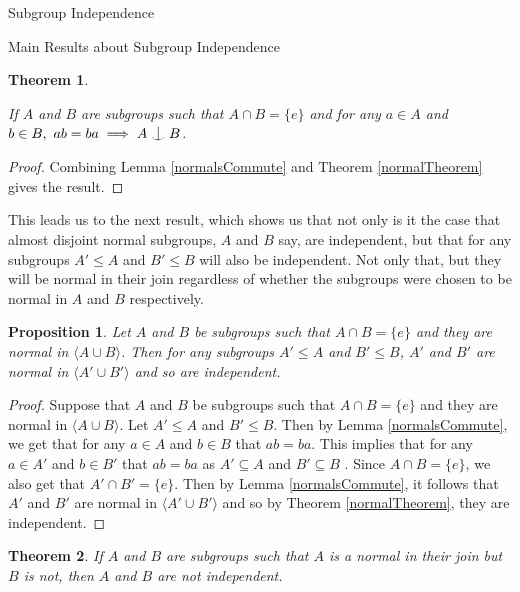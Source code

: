 \documentclass{article}
\newtheorem{proposition}{Proposition}[section]
\newtheorem{theorem}{Theorem}[section]
\def\indep{\mathrel{\raise0.2ex\hbox{\ooalign{\hidewidth$\vert$\hidewidth\cr\raise-0.9ex\hbox{$\smile$}}}}}
\begin{document}
\begin{section}{Subgroup Independence}
\begin{subsection}{Main Results about Subgroup Independence}
			
			\begin{theorem}\label{normalsC}
				
				If $A$ and $B$ are subgroups such that $A \cap B = \{e\}$ and for any $a \in A$ and $b \in B, \ ab =ba \implies A \indep B$. 
			\end{theorem}
			
			\begin{proof}
				
				Combining Lemma \ref{normalsCommute} and Theorem \ref{normalTheorem} gives the result.
			\end{proof}
			
			
			
			This leads us to the next result, which shows us that not only is it the case that almost disjoint normal subgroups, $A$ and $B$ say, are independent, but that for any subgroups $A' \leq A$ and $B' \leq B$  will also be independent. Not only that, but they will be normal in their join regardless of whether the subgroups were chosen to be normal in $A$ and $B$ respectively.
			
			\begin{proposition}
				Let $A$ and $B$ be subgroups such that $A \cap B = \{e\}$ and they are normal in $\langle A \cup B\rangle $. Then for any subgroups $A' \leq A$ and $B' \leq B$, $A'$ and $B'$ are normal in $\langle A' \cup B'\rangle $ and so are independent. 
			\end{proposition}
			
			\begin{proof}
				Suppose that $A$ and $B$ be subgroups such that $A \cap B = \{e\}$ and they are normal in $\langle A \cup B\rangle $. Let $A' \leq A$ and $B' \leq B$. Then by Lemma \ref{normalsCommute}, we get that for any $ a\in A$ and $b \in B$ that $ab=ba$. This implies that for any $a \in A'$ and $b \in B'$ that $ab = ba$ as $A' \subseteq A$ and $B' \subseteq B$ . Since $A \cap B = \{e\}$, we also get that $A' \cap B' = \{e\}.$ Then by Lemma \ref{normalsCommute}, it follows that $A'$ and $B'$ are normal in $\langle A' \cup B'\rangle $ and so by Theorem \ref{normalTheorem}, they are independent.
			\end{proof}
			
			
			
			
			\begin{theorem} \label{ppp}
				If $A$ and $B$ are subgroups such that $A$ is a normal in their join but 
				$B$ is not, then $A$ and $B$ are not independent.
			\end{theorem}	
			

\end{subsection}
\end{section}
\end{document}

